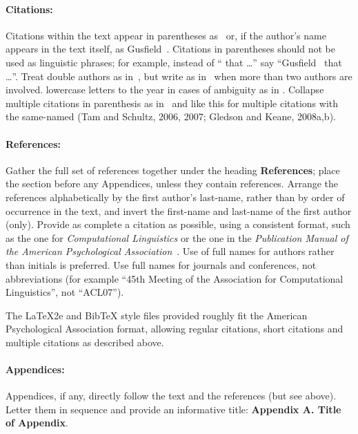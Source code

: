 \documentclass[11pt]{article}
\begin{document}
\paragraph{Citations:} Citations within the text appear in parentheses
as~\cite{Gusfield:97} or, if the author's name appears in the text itself, as
Gusfield~. Citations in parentheses should not be used
as linguistic phrases; for example, instead of ``\cite{Gusfield:97} 
that \ldots'' say ``Gusfield~  that \ldots''.
Treat double authors as in~\cite{Aho:72}, but write as in~\cite{Chandra:81} when more than
two authors are involved. 
 lowercase letters to the year in cases of ambiguity as in \cite{Gledson:08homog}. 
Collapse multiple citations in parenthesis as
in~\cite{Gusfield:97,Aho:72} and like this for multiple citations with the same-named 
(Tam and Schultz, 2006, 2007; Gledson and Keane, 2008a,b).

\paragraph{References:} Gather the full set of references together under the
heading {\bf References}; place the section before any Appendices, unless they
contain references. Arrange the references alphabetically by the first
author's last-name, rather than by order of occurrence in the text, and invert
the first-name and last-name of the first author (only). Provide as complete
a citation as possible, using a consistent format, such as the one for {\em
Computational Linguistics\/} or the one in the {\em Publication Manual of the
American Psychological Association\/}~\cite{APA:83}.  Use of full names for
authors rather than initials is preferred.  Use full names for journals and
conferences, not abbreviations (for example ``45th Meeting of the Association
for Computational Linguistics'', not ``ACL07'').

The \LaTeX2e{} and Bib\TeX{} style files provided roughly fit the
American Psychological Association format, allowing regular citations,
short citations and multiple citations as described above.

\paragraph{Appendices:} Appendices, if any, directly follow the text and the
references (but see above).  Letter them in sequence and provide an
informative title: {\bf Appendix A. Title of Appendix}.
\end{document}
